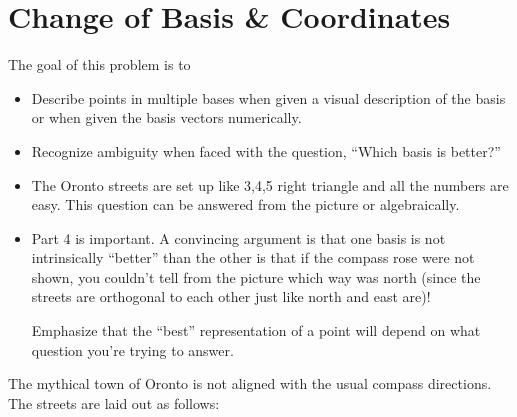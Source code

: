 \section*{Change of Basis \& Coordinates}

	\question
	\begin{annotation}
		\begin{goals}

			The goal of this problem is to
			\begin{itemize}
				\item Describe points in multiple bases when given a visual description of the basis
					or when given the basis vectors numerically.
				\item Recognize ambiguity when faced with the question, ``Which basis is better?''
			\end{itemize}
		\end{goals}

		\begin{notes}
			\begin{itemize}
				\item The Oronto streets are set up like 3,4,5 right triangle and all the numbers are easy.
					This question can be answered from the picture or algebraically.
				\item Part 4 is important. A convincing argument is that one basis is not intrinsically
					``better'' than the other is that if the compass rose were
					not shown, you couldn't tell from the picture which way was north (since the streets are orthogonal
					to each other just like north and east are)!

					Emphasize that the ``best'' representation of a point will depend on what
					question you're trying to answer.
			\end{itemize}
		\end{notes}
	\end{annotation}
	The mythical town of Oronto is not aligned with the usual
	compass directions. The streets are laid out as follows:

